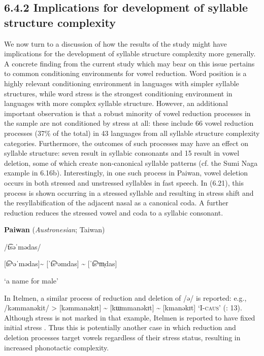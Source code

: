 \subsection{6.4.2 Implications for development of syllable structure complexity}

  We now turn to a discussion of how the results of the study might have implications for the development of syllable structure complexity more generally. A concrete finding from the current study which may bear on this issue pertains to common conditioning environments for vowel reduction. Word position is a highly relevant conditioning environment in languages with simpler syllable structures, while word stress is the strongest conditioning environment in languages with more complex syllable structure. However, an additional important observation is that a robust minority of vowel reduction processes in the sample are not conditioned by stress at all: these include 66 vowel reduction processes (37\% of the total) in 43 languages from all syllable structure complexity categories. Furthermore, the outcomes of such processes may have an effect on syllable structure: seven result in syllabic consonants and 15 result in vowel deletion, some of which create non-canonical syllable patterns (cf. the Sumi Naga example in 6.16b). Interestingly, in one such process in Paiwan, vowel deletion occurs in both stressed and unstressed syllables in fast speech. In (6.21), this process is shown occurring in a stressed syllable and resulting in stress shift and the resyllabification of the adjacent nasal as a canonical coda. A further reduction reduces the stressed vowel and coda to a syllabic consonant.



\ea\label{ex:(6.21)}
  \textbf{Paiwan} (\textit{Austronesian}; Taiwan)



/t͡səˈmədas/



[t͡sʰəˈmədas]{\textasciitilde} [ˈt͡sʰəmdas] {\textasciitilde} [ˈt͡sʰm̩das]



‘a name for male’



\citep[42]{Chang2006}
\z



In Itelmen, a similar process of reduction and deletion of /ə/ is reported: e.g., /kəmmanəkit/ > [kəmmanəkɪt] {\textasciitilde} [kɯmmanəkɪt] {\textasciitilde} [kmanəkɪt] ‘I-\textsc{caus}’ (\citealt{GeorgVolodin1999}: 13). Although stress is not marked in that example, Itelmen is reported to have fixed initial stress \citep[6]{Bobaljik2006}. Thus this is potentially another case in which reduction and deletion processes target vowels regardless of their stress status, resulting in increased phonotactic complexity. 



